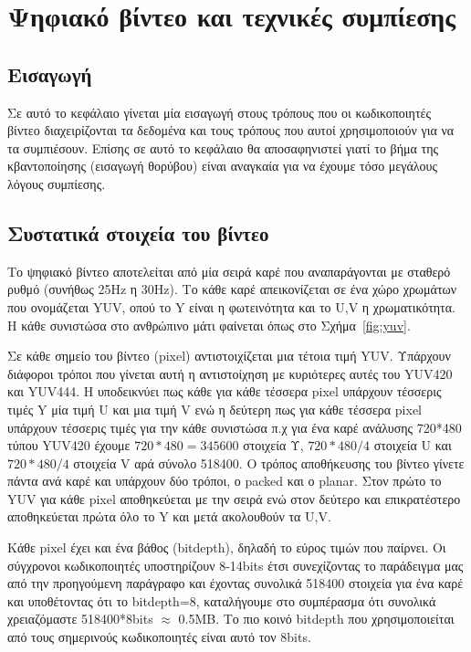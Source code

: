 ﻿\chapter{Ψηφιακό βίντεο και τεχνικές συμπίεσης}
\label{chapter:chap2}


\section{Εισαγωγή}
\label{section:sect21}
\indent Σε αυτό το κεφάλαιο γίνεται μία εισαγωγή στους τρόπους που οι κωδικοποιητές βίντεο διαχειρίζονται τα δεδομένα και τους τρόπους που αυτοί χρησιμοποιούν για να τα συμπιέσουν. Επίσης σε αυτό το κεφάλαιο θα αποσαφηνιστεί γιατί το βήμα της κβαντοποίησης (εισαγωγή θορύβου) είναι αναγκαία για να έχουμε τόσο μεγάλους λόγους συμπίεσης.

\section{Συστατικά στοιχεία του βίντεο}
\label{section:sect22}

\indent Το ψηφιακό βίντεο αποτελείται από μία σειρά καρέ που αναπαράγονται με σταθερό ρυθμό (συνήθως 25Hz η 30Hz). Το κάθε καρέ απεικονίζεται σε ένα χώρο χρωμάτων που ονομάζεται YUV, οπού το Y είναι η φωτεινότητα και το U,V η χρωματικότητα. Η κάθε συνιστώσα στο ανθρώπινο μάτι φαίνεται όπως στο Σχήμα~\ref{fig:yuv}.

\indent Σε κάθε σημείο του βίντεο (pixel) αντιστοιχίζεται μια τέτοια τιμή YUV. Υπάρχουν διάφοροι τρόποι που γίνεται αυτή η αντιστοίχηση με κυριότερες αυτές του YUV420 και YUV444. Η υποδεικνύει πως κάθε για κάθε τέσσερα pixel υπάρχουν τέσσερις τιμές Y μία τιμή U και μια τιμή V ενώ η δεύτερη πως για κάθε τέσσερα pixel υπάρχουν τέσσερις τιμές για την κάθε συνιστώσα π.χ για ένα καρέ ανάλυσης 720*480 τύπου YUV420 έχουμε \(720*480=345600\) στοιχεία Υ, \(720*480/4\) στοιχεία U και \(720*480/4 \) στοιχεία V αρά σύνολο 518400. Ο τρόπος αποθήκευσης του βίντεο γίνετε πάντα ανά καρέ και υπάρχουν δύο τρόποι, ο packed και ο planar. Στον πρώτο το YUV για κάθε pixel αποθηκεύεται με την σειρά ενώ στον δεύτερο και επικρατέστερο αποθηκεύεται πρώτα όλο το Y και μετά ακολουθούν τα U,V.

\indent Κάθε pixel έχει και ένα βάθος (bitdepth), δηλαδή το εύρος τιμών που παίρνει. Οι σύγχρονοι κωδικοποιητές υποστηρίζουν 8-14bits έτσι συνεχίζοντας το παράδειγμα μας από την προηγούμενη παράγραφο και έχοντας συνολικά 518400 στοιχεία για ένα καρέ και υποθέτοντας ότι το bitdepth=8, καταλήγουμε στο συμπέρασμα ότι συνολικά χρειαζόμαστε 518400*8bits $\approx$ 0.5MB. Το πιο κοινό bitdepth που χρησιμοποιείται από τους σημερινούς κωδικοποιητές είναι αυτό τον 8bits.

